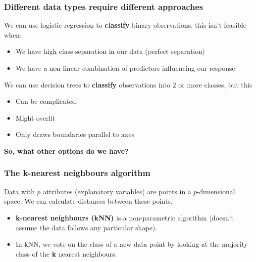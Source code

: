 \documentclass[a4paper]{article}
\begin{document}
\subsubsection{Different data types require different approaches}
We can use logistic regression to \textcolor{myblue}{\textbf{classify}} binary observations, this isn't feasible when:
\begin{itemize}
	\item We have high class separation in our data (perfect separation)
	\item We have a non-linear combination of predictors influencing our response
\end{itemize}
We can use decision trees to \textcolor{myblue}{\textbf{classify}} observations into 2 or more classes, but this
\begin{itemize}
	\item Can be complicated
	\item Might overfit
	\item Only draws boundaries parallel to axes
\end{itemize}
\begin{greenbox}
	\textbf{So, what other options do we have?}
\end{greenbox}
\subsubsection{The k-nearest neighbours algorithm}
\begin{goldbox}
	Data with \( p \) attributes (explanatory variables) are points in a \( p \)-dimensional space. We can calculate distances between these points.
\end{goldbox}
\begin{itemize}
	\item \textcolor{mygreen}{\textbf{k-nearest neighbours (kNN)}} is a non-parametric algorithm (doesn't assume the data follows any particular shape).
	\item In kNN, we vote on the class of a new data point by looking at the majority class of the \textcolor{mygreen}{\textbf{k}} nearest neighbours.
\end{itemize}
\end{document}
